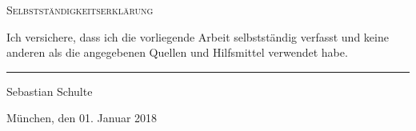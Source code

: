 \begin{declaration}
	
	\textsc{\huge Selbstständigkeitserklärung }\\[0.9cm] %
	
	\vspace{4.0cm}
	
	\noindent Ich versichere, dass ich die vorliegende Arbeit selbstst\"andig verfasst und keine anderen als die angegebenen Quellen und Hilfsmittel verwendet habe.
	\vspace{1.5cm}

	

		\begin{flushright}
		\noindent\rule{5cm}{.4pt}\par
		Sebastian Schulte\par
		M\"unchen, den 01. Januar 2018\par
	\end{flushright}
	
\end{declaration}






